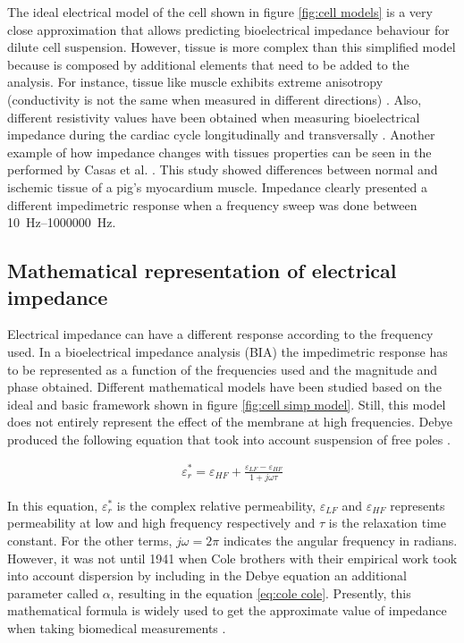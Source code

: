 The ideal electrical model of the cell shown in figure \ref{fig:cell models} is a very close approximation that allows predicting bioelectrical impedance behaviour for dilute cell suspension. However, tissue is more complex than this simplified model because is composed by additional elements that need to be added to the analysis. For instance, tissue like muscle exhibits extreme anisotropy (conductivity is not the same when measured in different directions) \cite{lvovich2012impedance,dean2008electrical,foster1995dielectric}. Also, different resistivity values have been obtained when measuring bioelectrical impedance during the cardiac cycle longitudinally and transversally \cite{steendijk1993four}. Another example of how impedance changes with tissues properties can be seen in the performed by Casas et al. \cite{casas1999vivo}. This study showed differences between normal and ischemic tissue of a pig's myocardium muscle. Impedance clearly presented a different impedimetric response when a frequency sweep was done between \SIrange[scientific-notation = engineering]{10}{1000000}{\hertz}. 

\subsection{Mathematical representation of electrical impedance}
Electrical impedance can have a different response according to the frequency used. In a bioelectrical impedance analysis (BIA) the impedimetric response has to be represented as a function of the frequencies used and the magnitude and phase obtained. Different mathematical models have been studied based on the ideal and basic framework shown in figure \ref{fig:cell simp model}. Still, this model does not entirely represent the effect of the membrane at high frequencies. Debye produced the following equation that took into account suspension of free poles \cite{bertemes2002tissue}.

\begin{align}
\label{eq:Debye}
\varepsilon_r^* = \varepsilon_{HF} + \frac{\varepsilon_{LF} - \varepsilon_{HF}}{1 + j \omega \tau}
\end{align}

In this equation, $\varepsilon_r^*$ is the complex relative permeability, $\varepsilon_{LF}$ and $\varepsilon_{HF}$ represents permeability at low and high frequency respectively and $\tau$ is the relaxation time constant. For the other terms, $j \omega =2 \pi$ indicates the angular frequency in radians. However, it was not until 1941 when Cole brothers with their empirical work took into account dispersion by including in the Debye equation an additional parameter called $\alpha$, resulting in the equation \ref{eq:cole cole}. Presently, this mathematical formula is widely used to get the approximate value of impedance when taking biomedical measurements \cite{cole1941dispersion}.

